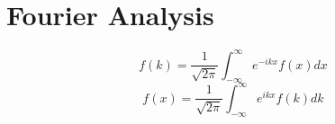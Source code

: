 \chapter{Fourier Analysis}

\begin{equation}
	f(k) = \frac{1}{\sqrt{2\pi}}\int_{-\infty}^{\infty}	e^{-ikx}f(x)dx
\end{equation}
\begin{equation}
	f(x) = \frac{1}{\sqrt{2\pi}}\int_{-\infty}^{\infty} e^{ikx} f(k) dk
\end{equation}
